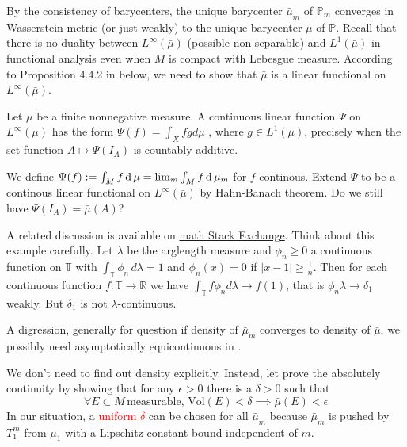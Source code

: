 By the consistency of barycenters, the unique barycenter $\bar{\mu}_m$ of $\mathbb{P}_m$
converges in Wasserstein metric (or just weakly) to the unique barycenter $\bar{\mu}$ of $\mathbb{P}$.
Recall that there is no duality between $L^{\infty}(\bar{\mu})$ (possible non-separable) and $L^1 (\bar{\mu})$
in functional analysis even when $M$ is compact with Lebesgue measure.
According to Proposition 4.4.2 in \cite{Bogachev2007} below, we need to show that $\bar{\mu}$ is a linear functional on $L^{\infty}(\bar{\mu})$.
\begin{prop}
	Let \( \mu \) be a finite nonnegative measure.
	A continuous linear function \( \Psi \) on \( L ^ { \infty } ( \mu ) \) has the form
	\( \Psi ( f ) = \int _ { X } f g d \mu \)
	, where \( g \in L ^ { 1 } ( \mu ) \),
	precisely when the set function \( A \mapsto \Psi \left( I _ { A } \right) \) is countably additive.
\end{prop}

We define $\Psi(f):= \int_M f \operatorname{d} \bar{\mu} = \lim_m \int_M f \operatorname{d} \bar{\mu}_m$ for $f$ continous.
Extend $\Psi$ to be a continous linear functional on $L^{\infty}(\bar{\mu})$ by Hahn-Banach theorem.
Do we still have $\Psi(I_A) = \bar{\mu}(A)$?

A related discussion is available on
\href{https://math.stackexchange.com/questions/574130/does-weak-convergence-with-uniformly-bounded-densities-imply-absolute-continuity/574888#574888}{math Stack Exchange}.
Think about this example carefully.
Let $\lambda$ be the arglength measure and $\phi_n \ge 0$ a continuous function on $\mathbb T$ with $\int_{\mathbb T} \phi_n\, d\lambda = 1$ and $\phi_n(x) = 0$ if $|x-1| \ge \frac 1n$. Then for each continuous function $f\colon \mathbb T \to \mathbb R$ we have $\int_{\mathbb T} f\phi_n d\lambda \to f(1)$, that is $\phi_n \lambda \to \delta_1$ weakly. But $\delta_1$ is not $\lambda$-continuous.

A digression, generally for question if density of $\bar{\mu}_m$ converges to density of $\bar{\mu}$,
we possibly need asymptotically equicontinuous in \cite{Sweeting1986Converse}.

We don't need to find out density explicitly.
Instead, let prove the absolutely continuity by showing that
for any $\epsilon > 0$ there is a $\delta > 0$ such that
\begin{equation}
	\label{equa:absolutely_continous}
	\forall E \subset M \, \text{measurable, } \text{Vol}(E) < \delta
	\implies \bar{\mu}(E) < \epsilon
\end{equation}
In our situation, a \textcolor{red}{uniform $\delta$} can be chosen for all $\bar{\mu}_m$
because $\bar{\mu}_m$ is pushed by $T_1^{m}$ from $\mu_1$ with a Lipschitz constant bound
independent of $m$.

